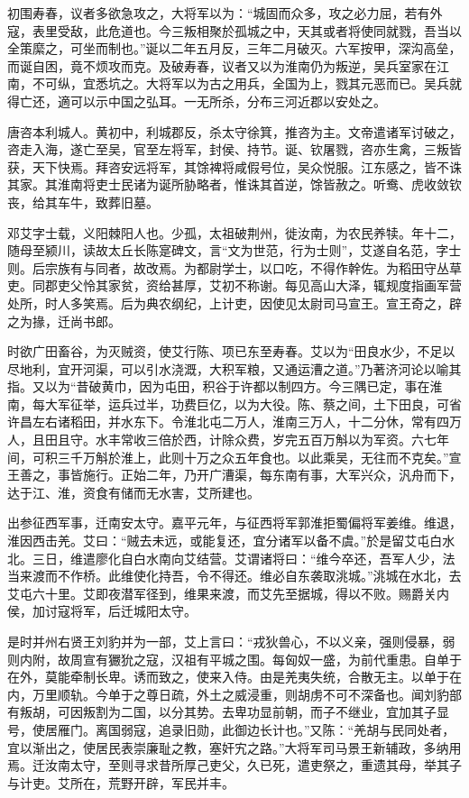 \documentclass[12pt,UTF8]{ctexbook}
\begin{document}
初围寿春，议者多欲急攻之，大将军以为：“城固而众多，攻之必力屈，若有外寇，表里受敌，此危道也。今三叛相聚於孤城之中，天其或者将使同就戮，吾当以全策縻之，可坐而制也。”诞以二年五月反，三年二月破灭。六军按甲，深沟高垒，而诞自困，竟不烦攻而克。及破寿春，议者又以为淮南仍为叛逆，吴兵室家在江南，不可纵，宜悉坑之。大将军以为古之用兵，全国为上，戮其元恶而已。吴兵就得亡还，適可以示中国之弘耳。一无所杀，分布三河近郡以安处之。

唐咨本利城人。黄初中，利城郡反，杀太守徐箕，推咨为主。文帝遣诸军讨破之，咨走入海，遂亡至吴，官至左将军，封侯、持节。诞、钦屠戮，咨亦生禽，三叛皆获，天下快焉。拜咨安远将军，其馀裨将咸假号位，吴众悦服。江东感之，皆不诛其家。其淮南将吏士民诸为诞所胁略者，惟诛其首逆，馀皆赦之。听鸯、虎收敛钦丧，给其车牛，致葬旧墓。

邓艾字士载，义阳棘阳人也。少孤，太祖破荆州，徙汝南，为农民养犊。年十二，随母至颍川，读故太丘长陈寔碑文，言“文为世范，行为士则”，艾遂自名范，字士则。后宗族有与同者，故改焉。为都尉学士，以口吃，不得作幹佐。为稻田守丛草吏。同郡吏父怜其家贫，资给甚厚，艾初不称谢。每见高山大泽，辄规度指画军营处所，时人多笑焉。后为典农纲纪，上计吏，因使见太尉司马宣王。宣王奇之，辟之为掾，迁尚书郎。

时欲广田畜谷，为灭贼资，使艾行陈、项已东至寿春。艾以为“田良水少，不足以尽地利，宜开河渠，可以引水浇溉，大积军粮，又通运漕之道。”乃著济河论以喻其指。又以为“昔破黄巾，因为屯田，积谷于许都以制四方。今三隅已定，事在淮南，每大军征举，运兵过半，功费巨亿，以为大役。陈、蔡之间，土下田良，可省许昌左右诸稻田，并水东下。令淮北屯二万人，淮南三万人，十二分休，常有四万人，且田且守。水丰常收三倍於西，计除众费，岁完五百万斛以为军资。六七年间，可积三千万斛於淮上，此则十万之众五年食也。以此乘吴，无往而不克矣。”宣王善之，事皆施行。正始二年，乃开广漕渠，每东南有事，大军兴众，汎舟而下，达于江、淮，资食有储而无水害，艾所建也。

出参征西军事，迁南安太守。嘉平元年，与征西将军郭淮拒蜀偏将军姜维。维退，淮因西击羌。艾曰：“贼去未远，或能复还，宜分诸军以备不虞。”於是留艾屯白水北。三日，维遣廖化自白水南向艾结营。艾谓诸将曰：“维今卒还，吾军人少，法当来渡而不作桥。此维使化持吾，令不得还。维必自东袭取洮城。”洮城在水北，去艾屯六十里。艾即夜潜军径到，维果来渡，而艾先至据城，得以不败。赐爵关内侯，加讨寇将军，后迁城阳太守。

是时并州右贤王刘豹并为一部，艾上言曰：“戎狄兽心，不以义亲，强则侵暴，弱则内附，故周宣有玁狁之寇，汉祖有平城之围。每匈奴一盛，为前代重患。自单于在外，莫能牵制长卑。诱而致之，使来入侍。由是羌夷失统，合散无主。以单于在内，万里顺轨。今单于之尊日疏，外土之威浸重，则胡虏不可不深备也。闻刘豹部有叛胡，可因叛割为二国，以分其势。去卑功显前朝，而子不继业，宜加其子显号，使居雁门。离国弱寇，追录旧勋，此御边长计也。”又陈：“羌胡与民同处者，宜以渐出之，使居民表崇廉耻之教，塞奸宄之路。”大将军司马景王新辅政，多纳用焉。迁汝南太守，至则寻求昔所厚己吏父，久已死，遣吏祭之，重遗其母，举其子与计吏。艾所在，荒野开辟，军民并丰。
\end{document}
